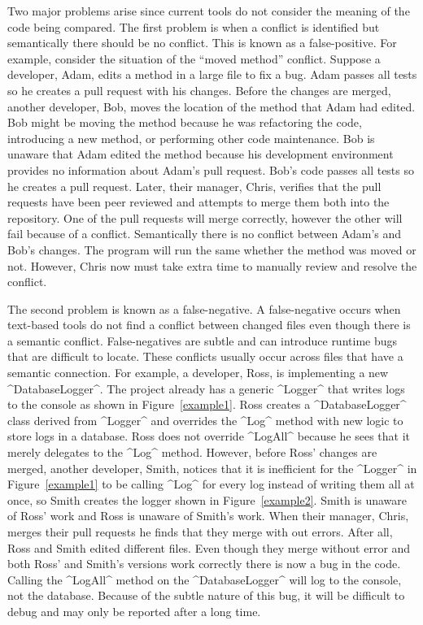 \documentclass[draftclsnofoot,onecolumn]{IEEEtran}
\begin{document}
Two major problems arise since current tools do not consider the meaning of the code being compared. The first problem is when a conflict is identified but semantically there should be no conflict. This is known as a false-positive. For example, consider the situation of the ``moved method'' conflict. Suppose a developer, Adam, edits a method in a large file to fix a bug. Adam passes all tests so he creates a pull request with his changes. Before the changes are merged, another developer, Bob, moves the location of the method that Adam had edited. Bob might be moving the method because he was refactoring the code, introducing a new method, or performing other code maintenance. Bob is unaware that Adam edited the method because his development environment provides no information about Adam's pull request. Bob's code passes 
all tests so he creates a pull request. Later, their manager, Chris, verifies that the pull requests have been peer reviewed and attempts to merge them both into the repository. One of the pull requests will merge correctly, however the other will fail because of a conflict. Semantically there is no conflict between Adam's and Bob's changes. The program will run the same whether the method was moved or not. However, Chris now must take extra time to manually review and resolve the conflict.

The second problem is known as a false-negative. A false-negative occurs when text-based tools do not find a conflict between changed files even though there is a semantic conflict. False-negatives are subtle and can introduce runtime bugs that are difficult to locate. These conflicts usually occur across files that have a semantic connection. For example, a developer, Ross, is implementing a new ^DatabaseLogger^. The project already has a generic ^Logger^ that writes logs to the console as shown in Figure~\ref{example1}. Ross creates a ^DatabaseLogger^ class derived from ^Logger^ and overrides the ^Log^ method with new logic to store logs in a database. Ross does not override ^LogAll^ because he sees that it merely delegates to the ^Log^ method. However, before Ross' changes are merged, another developer, Smith, notices 
that it is inefficient for the ^Logger^ in Figure~\ref{example1} to be calling ^Log^ for every log instead of writing them all at once, so Smith creates the logger shown in Figure~\ref{example2}. Smith is unaware of Ross' work and Ross is unaware of Smith's work. When their manager, Chris, merges their pull requests he finds that they merge with out errors. After all, Ross and Smith edited different files. Even though they merge without error and both Ross' and Smith's versions work correctly there is now a bug in the code. Calling the ^LogAll^ method on the ^DatabaseLogger^ will log to the console, not the database. Because of the subtle nature of this bug, it will be difficult to debug and may only be reported after a long time.
\end{document}
